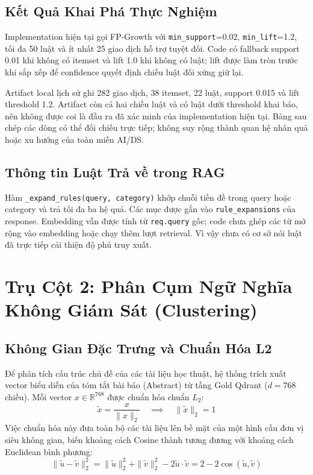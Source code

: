 \subsection{Kết Quả Khai Phá Thực Nghiệm}
Implementation hiện tại gọi FP-Growth với \texttt{min\_support}=0.02, \texttt{min\_lift}=1.2, tối đa 50 luật và ít nhất 25 giao dịch hỗ trợ tuyệt đối. Code có fallback support 0.01 khi không có itemset và lift 1.0 khi không có luật; lift được làm tròn trước khi sắp xếp để confidence quyết định chiều luật đối xứng giữ lại.

Artifact local lịch sử ghi 282 giao dịch, 38 itemset, 22 luật, support 0.015 và lift threshold 1.2. Artifact còn cả hai chiều luật và có luật dưới threshold khai báo, nên không được coi là đầu ra đã xác minh của implementation hiện tại. Bảng sau chép các dòng có thể đối chiếu trực tiếp; không suy rộng thành quan hệ nhân quả hoặc xu hướng của toàn miền AI/DS.


\subsection{Thông tin Luật Trả về trong RAG}
Hàm \texttt{\_expand\_rules(query, category)} khớp chuỗi tiền đề trong query hoặc category và trả tối đa ba hệ quả. Các mục được gắn vào \texttt{rule\_expansions} của response. Embedding vẫn được tính từ \texttt{req.query} gốc; code chưa ghép các từ mở rộng vào embedding hoặc chạy thêm lượt retrieval. Vì vậy chưa có cơ sở nói luật đã trực tiếp cải thiện độ phủ truy xuất.

\section{Trụ Cột 2: Phân Cụm Ngữ Nghĩa Không Giám Sát (Clustering)}

\subsection{Không Gian Đặc Trưng và Chuẩn Hóa L2}
Để phân tích cấu trúc chủ đề của các tài liệu học thuật, hệ thống trích xuất vector biểu diễn của tóm tắt bài báo (Abstract) từ tầng Gold Qdrant ($d = 768$ chiều). Mỗi vector $x \in \mathbb{R}^{768}$ được chuẩn hóa chuẩn $L_2$:
\begin{equation}
  \tilde{x} = \frac{x}{\|x\|_2} \quad \implies \quad \|\tilde{x}\|_2 = 1
\end{equation}
Việc chuẩn hóa này đưa toàn bộ các tài liệu lên bề mặt của một hình cầu đơn vị siêu không gian, biến khoảng cách Cosine thành tương đương với khoảng cách Euclidean bình phương:
\begin{equation}
  \|\tilde{u} - \tilde{v}\|_2^2 = \|\tilde{u}\|_2^2 + \|\tilde{v}\|_2^2 - 2 \tilde{u} \cdot \tilde{v} = 2 - 2\cos(\tilde{u}, \tilde{v})
\end{equation}

